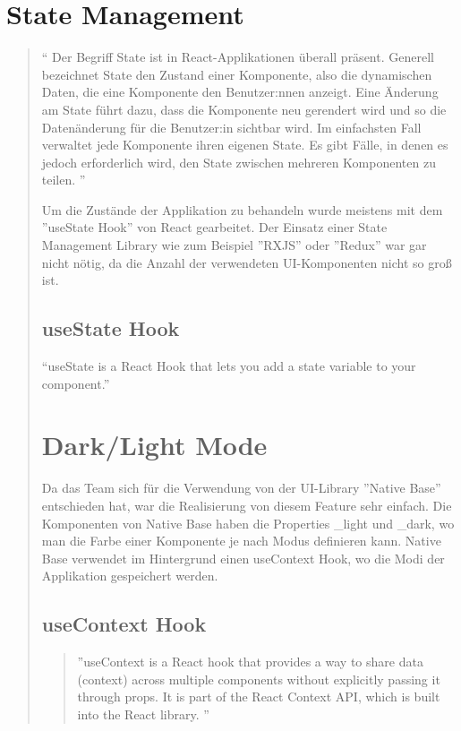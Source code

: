 \section{State Management}
\begin{quotation}
  ``
  Der Begriff State ist in React-Applikationen überall präsent. Generell
  bezeichnet State den Zustand einer Komponente,
  also die dynamischen Daten, die eine Komponente den Benutzer:nnen anzeigt.
  Eine Änderung am State führt dazu, dass die Komponente neu gerendert wird
  und so die Datenänderung für die Benutzer:in sichtbar wird.
  Im einfachsten Fall verwaltet jede Komponente ihren eigenen State.
  Es gibt Fälle, in denen es jedoch erforderlich wird,
  den State zwischen mehreren Komponenten zu teilen.
  ''
  \cite{state-management}

  Um die Zustände der Applikation zu behandeln wurde meistens mit dem ''useState Hook'' von React gearbeitet.
  Der Einsatz einer State Management Library wie zum Beispiel ''RXJS'' oder ''Redux'' war gar nicht nötig, da die Anzahl der verwendeten UI-Komponenten nicht so groß ist.

  \subsection{useState Hook}
  ``useState is a React Hook that lets you add a state variable to your component.'' \cite{useState}


  \section{Dark/Light Mode}
  Da das Team sich für die Verwendung von der UI-Library ''Native Base'' entschieden hat, war die Realisierung von diesem Feature sehr einfach.
  Die Komponenten von Native Base haben die Properties \_light und \_dark, wo man die Farbe einer Komponente je nach Modus definieren kann.
  Native Base verwendet im Hintergrund einen useContext Hook, wo die Modi der Applikation gespeichert werden.
  \subsection{useContext Hook}
  \begin{quotation}
    ''useContext is a React hook that provides a way to share data (context)
    across multiple components without explicitly passing it through props.
    It is part of the React Context API, which is built into the React library.
    '' \cite{useContext}

  \end{quotation}




\end{quotation}


